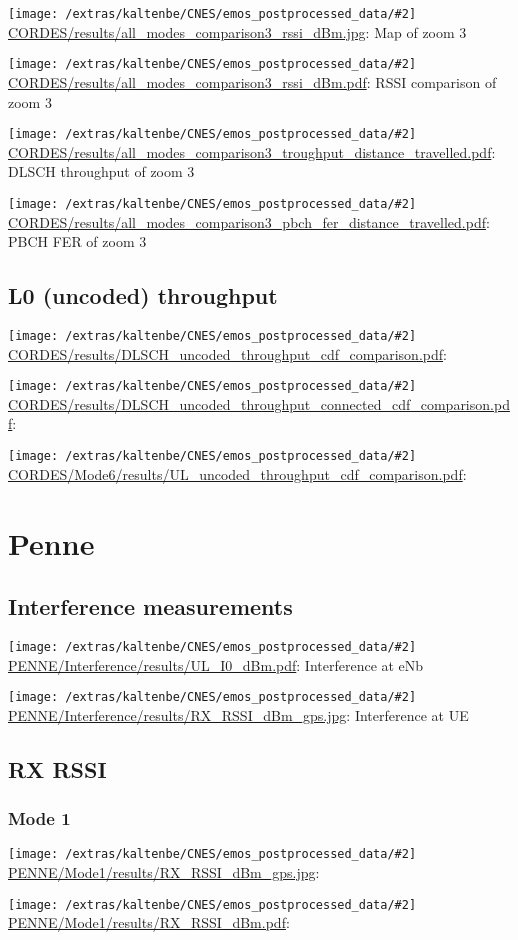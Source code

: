 \documentclass[a4paper,10pt]{article}
\newcommand{\printfile}[2][]{
 \begin{minipage}{8cm}
  \centering
  \texttt{[image: /extras/kaltenbe/CNES/emos\_postprocessed\_data/\#2]}
  \url{#2}: #1

 \end{minipage}
}
\begin{document}
\printfile[Map of zoom 3]{CORDES/results/all_modes_comparison3_rssi_dBm.jpg}
\printfile[RSSI comparison of zoom 3]{CORDES/results/all_modes_comparison3_rssi_dBm.pdf}

\printfile[DLSCH throughput of zoom 3]{CORDES/results/all_modes_comparison3_troughput_distance_travelled.pdf}
\printfile[PBCH FER of zoom 3]{CORDES/results/all_modes_comparison3_pbch_fer_distance_travelled.pdf}

\subsection{L0 (uncoded) throughput}

\printfile{CORDES/results/DLSCH_uncoded_throughput_cdf_comparison.pdf}
\printfile{CORDES/results/DLSCH_uncoded_throughput_connected_cdf_comparison.pdf}

\printfile{CORDES/Mode6/results/UL_uncoded_throughput_cdf_comparison.pdf}

\section{Penne}
\label{sec:penne}

\subsection{Interference measurements}

\printfile[Interference at eNb]{PENNE/Interference/results/UL_I0_dBm.pdf}
\printfile[Interference at UE]{PENNE/Interference/results/RX_RSSI_dBm_gps.jpg}


\subsection{RX RSSI}


% 

\subsubsection{Mode 1}
\printfile{PENNE/Mode1/results/RX_RSSI_dBm_gps.jpg}
\printfile{PENNE/Mode1/results/RX_RSSI_dBm.pdf}
\end{document}
